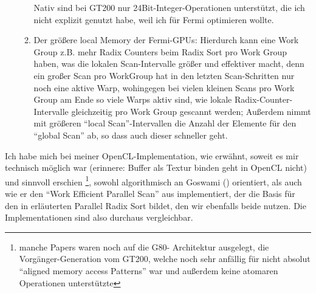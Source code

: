 \begin{enumerate}
\begin{enumerate}
			Nativ sind bei GT200 nur 24Bit-Integer-Operationen unterstützt, die ich nicht explizit genutzt habe, weil ich
			für Fermi optimieren wollte.
			\item Der größere local Memory der Fermi-GPUs:
				Hierdurch kann eine Work Group z.B. mehr Radix Counters beim Radix Sort pro Work Group haben, 
				was die lokalen Scan-Intervalle größer und effektiver macht, denn ein großer Scan pro WorkGroup 
				hat in den letzten Scan-Schritten nur noch eine aktive Warp, wohingegen bei vielen kleinen Scans pro Work 					Group am Ende so viele Warps aktiv sind, wie lokale Radix-Counter-Intervalle gleichzeitig pro Work Group 	
				gescannt werden; Außerdem nimmt mit größeren "`local Scan"'-Intervallen die Anzahl der Elemente für den
				"`global Scan"' ab, so dass auch dieser schneller geht.
			\end{enumerate}	
	\end{enumerate}
	
	
	
	
	
	
	Ich habe mich bei meiner OpenCL-Implementation, wie erwähnt, soweit es mir technisch möglich war (erinnere: Buffer als
	Textur binden geht in OpenCL nicht) und sinnvoll erschien
	\footnote{manche Papers waren noch auf die G80- Architektur
		ausgelegt, die Vorgänger-Generation vom GT200, welche noch sehr anfällig für nicht absolut 
		"`aligned memory access Patterns"' war und außerdem keine atomaren Operationen unterstützte},
	sowohl algorithmisch an Goswami (\cite{Goswami2010}) orientiert, als auch wie er den 
	"`Work Efficient Parallel Scan"' aus \cite{Harris2007} implementiert, der die Basis für den in \cite{Grand2008} 
	erläuterten Parallel Radix Sort bildet, den wir ebenfalls beide nutzen.
	Die Implementationen sind also durchaus vergleichbar.
	
